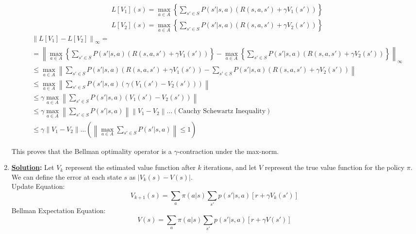 \documentclass[12pt]{article}
\newcommand{\solution}{\noindent \textbf{\underline{Solution}: }}
\newcommand*{\n}[1]{\left\lvert #1 \right\rvert}
\begin{document}
\begin{enumerate}
    \begin{align*}
        &L[V_1](s) = \max_{a \in A} \left\{ \sum_{s' \in S} P(s' | s, a) \left( R(s, a, s') + \gamma V_1(s') \right) \right\} \\
        &L[V_2](s) = \max_{a \in A} \left\{ \sum_{s' \in S} P(s' | s, a) \left( R(s, a, s') + \gamma V_2(s') \right) \right\} 
    \end{align*}
    \begin{align*}
        &\left\lVert L[V_1] - L[V_2]\right\rVert _\infty = \\
        &= \left\lVert \max_{a \in A} \left\{ \sum_{s' \in S} P(s' | s, a) \left( R(s, a, s') + \gamma V_1(s') \right) \right\} - \max_{a \in A} \left\{ \sum_{s' \in S} P(s' | s, a) \left( R(s, a, s') + \gamma V_2(s') \right) \right\} \right\rVert _\infty\\
        &\leq \max_{a \in A} \left\lVert \sum_{s' \in S} P(s' | s, a) \left( R(s, a, s') + \gamma V_1(s') \right)- \sum_{s' \in S} P(s' | s, a) \left( R(s, a, s') + \gamma V_2(s') \right) \right\rVert \\
        &\leq  \max_{a \in A}  \left\lVert \sum_{s' \in S} P(s' | s, a) \left( \gamma \left(V_1(s') - V_2(s') \right) \right) \right\rVert \\
        &\leq \gamma \max_{a \in A}  \left\lVert \sum_{s' \in S} P(s' | s, a) \left(V_1(s') - V_2(s') \right) \right\rVert  \\
        &\leq \gamma \max_{a \in A} \left\lVert \sum_{s' \in S} P(s' | s, a) \right\rVert \left\lVert V_1 - V_2 \right\rVert  \dots \left( \text{Cauchy Schewartz Inequality}\right) \\
        &\leq \gamma \left\lVert V_1 - V_2 \right\rVert \dots { \left( \left\lVert \max_{a \in A} \sum_{s' \in S} P(s' | s, a) \right\rVert \leq 1 \right)}
    \end{align*}

    
    This proves that the Bellman optimality operator is a $\gamma$-contraction under the max-norm.

    \item \solution
    Let $V_k$ represent the estimated value function after $k$ iterations, and let $V$ represent the true value function for the policy $\pi$. We can define the error at each state $s$ as 
    $\n{V_k(s) - V(s)}$. \\
    Update Equation: $$V_{k+1}(s) = \sum_{a} \pi(a|s) \sum_{s'} p(s'|s, a) [r + \gamma V_k(s')]$$ 
    Bellman Expectation Equation: $$V(s) = \sum_{a} \pi(a|s) \sum_{s'} p(s'|s, a) [r + \gamma V(s')]$$ 


\end{enumerate}
\end{document}
